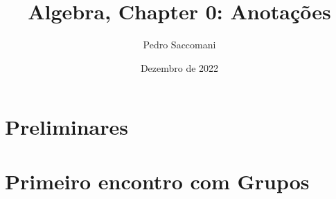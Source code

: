 \documentclass{article}
\title{Algebra, Chapter 0: Anotações}
\author{Pedro Saccomani}
\date{Dezembro de 2022}
\theoremstyle{plain}
\theoremstyle{definition}
\theoremstyle{remark}
\begin{document}
\newcommand{\cat}{\mathfrak{C}} \newcommand{\Hom }{\text{Hom}}
\newcommand{\Obj}{\text{Obj}}
\newcommand{\modset}[1]{\mathbb Z/ #1\mathbb Z}
\newcommand{\gcd}{\text{gcd}}


\maketitle
\section{Preliminares}

\section{Primeiro encontro com Grupos}

\end{document}

